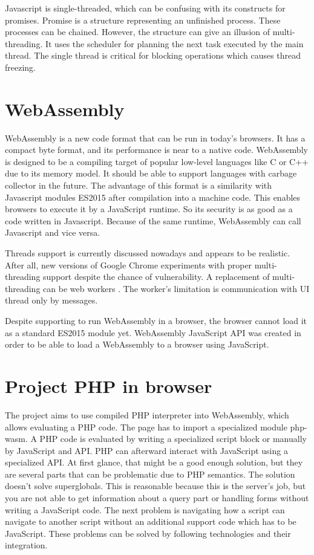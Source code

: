 Javascript is single-threaded, which can be confusing with its constructs for promises.
Promise is a structure representing an unfinished process.
These processes can be chained.
However, the structure can give an illusion of multi-threading. It uses the scheduler for planning the next task executed by the main thread.
The single thread is critical for blocking operations which causes thread freezing.

\section{WebAssembly}

WebAssembly \cite{9} is a new code format that can be run in today's browsers. 
It has a compact byte format, and its performance is near to a native code. 
WebAssembly is designed to be a compiling target of popular low-level languages like C or C++ due to its memory model. 
It should be able to support languages with carbage collector in the future. 
The advantage of this format is a similarity with Javascript modules ES2015 after compilation into a machine code. 
This enables browsers to execute it by a JavaScript runtime. 
So its security is as good as a code written in Javascript. 
Because of the same runtime, WebAssembly can call Javascript and vice versa.

Threads \cite{10} support is currently discussed nowadays and appears to be realistic.
After all, new versions of Google Chrome experiments with proper multi-threading support despite the chance of vulnerability.
A replacement of multi-threading can be web workers \cite{11}.
The worker's limitation is communication with UI thread only by messages.

Despite supporting to run WebAssembly in a browser, the browser cannot load it as a standard ES2015 module yet.
WebAssembly JavaScript API was created in order to be able to load a WebAssembly to a browser using JavaScript.

\section{Project PHP in browser}

The project \cite{2} aims to use compiled PHP interpreter into WebAssembly, which allows evaluating a PHP code.
The page has to import a specialized module php-wasm. 
A PHP code is evaluated by writing a specialized script block or manually by JavaScript and API.
PHP can afterward interact with JavaScript using a specialized API.
At first glance, that might be a good enough solution, but they are several parts that can be problematic due to PHP semantics.
The solution doesn't solve superglobals. 
This is reasonable because this is the server's job, but you are not able to get information about a query part or handling forms without writing a JavaScript code.
The next problem is navigating how a script can navigate to another script without an additional support code which has to be JavaScript.
These problems can be solved by following technologies and their integration.

